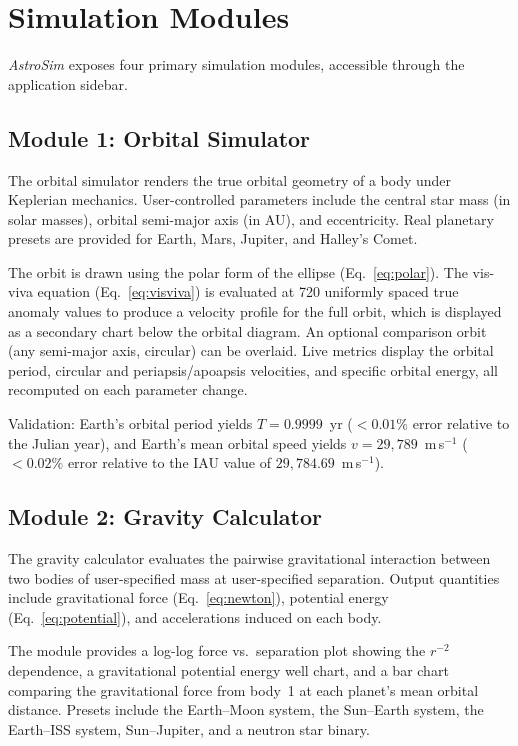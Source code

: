\documentclass[10pt,a4paper]{article}
\begin{document}
\section{Simulation Modules}

\textit{AstroSim} exposes four primary simulation modules, accessible through
the application sidebar.

\subsection{Module 1: Orbital Simulator}

The orbital simulator renders the true orbital geometry of a body under
Keplerian mechanics.
User-controlled parameters include the central star mass (in solar masses),
orbital semi-major axis (in AU), and eccentricity.
Real planetary presets are provided for Earth, Mars, Jupiter, and Halley's
Comet.

The orbit is drawn using the polar form of the ellipse (Eq.~\ref{eq:polar}).
The vis-viva equation (Eq.~\ref{eq:visviva}) is evaluated at 720 uniformly
spaced true anomaly values to produce a velocity profile for the full orbit,
which is displayed as a secondary chart below the orbital diagram.
An optional comparison orbit (any semi-major axis, circular) can be overlaid.
Live metrics display the orbital period, circular and periapsis/apoapsis
velocities, and specific orbital energy, all recomputed on each parameter
change.

Validation: Earth's orbital period yields $T = 0.9999$~yr ($<0.01\%$ error
relative to the Julian year), and Earth's mean orbital speed yields
$v = 29{,}789$~m\,s$^{-1}$ ($<0.02\%$ error relative to the IAU value of
$29{,}784.69$~m\,s$^{-1}$).

\subsection{Module 2: Gravity Calculator}

The gravity calculator evaluates the pairwise gravitational interaction between
two bodies of user-specified mass at user-specified separation.
Output quantities include gravitational force (Eq.~\ref{eq:newton}),
potential energy (Eq.~\ref{eq:potential}), and accelerations induced on each
body.

The module provides a log-log force vs.\ separation plot showing the $r^{-2}$
dependence, a gravitational potential energy well chart, and a bar chart
comparing the gravitational force from body~1 at each planet's mean orbital
distance.
Presets include the Earth--Moon system, the Sun--Earth system, the
Earth--ISS system, Sun--Jupiter, and a neutron star binary.
\end{document}
